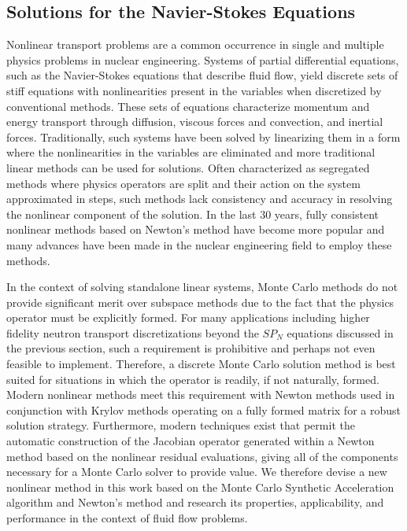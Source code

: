 \subsection{Solutions for the Navier-Stokes Equations}
\label{subsec:ns_motiviation}

Nonlinear transport problems are a common occurrence in single and
multiple physics problems in nuclear engineering. Systems of partial
differential equations, such as the Navier-Stokes equations that
describe fluid flow, yield discrete sets of stiff equations with
nonlinearities present in the variables when discretized by
conventional methods. These sets of equations characterize momentum
and energy transport through diffusion, viscous forces and convection,
and inertial forces. Traditionally, such systems have been solved by
linearizing them in a form where the nonlinearities in the variables
are eliminated and more traditional linear methods can be used for
solutions. Often characterized as segregated methods where physics
operators are split and their action on the system approximated in
steps, such methods lack consistency and accuracy in resolving the
nonlinear component of the solution. In the last 30 years, fully
consistent nonlinear methods based on Newton's method have become more
popular and many advances have been made in the nuclear engineering
field to employ these methods.

In the context of solving standalone linear systems, Monte Carlo
methods do not provide significant merit over subspace methods due to
the fact that the physics operator must be explicitly formed. For many
applications including higher fidelity neutron transport
discretizations beyond the $SP_N$ equations discussed in the previous
section, such a requirement is prohibitive and perhaps not even
feasible to implement. Therefore, a discrete Monte Carlo solution
method is best suited for situations in which the operator is readily,
if not naturally, formed. Modern nonlinear methods meet this
requirement with Newton methods used in conjunction with Krylov
methods operating on a fully formed matrix for a robust solution
strategy. Furthermore, modern techniques exist that permit the
automatic construction of the Jacobian operator generated within a
Newton method based on the nonlinear residual evaluations, giving all
of the components necessary for a Monte Carlo solver to provide
value. We therefore devise a new nonlinear method in this work based
on the Monte Carlo Synthetic Acceleration algorithm and Newton's
method and research its properties, applicability, and performance in
the context of fluid flow problems.

